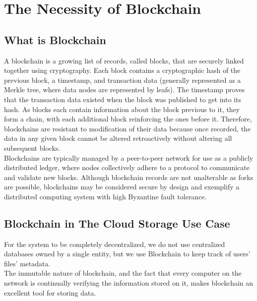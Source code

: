 
\section{The Necessity of Blockchain}

\subsection{What is Blockchain}

A blockchain is a growing list of records, called blocks, that are securely linked together using cryptography. Each block contains a cryptographic hash of the previous block, a timestamp, and transaction data (generally represented as a Merkle tree, where data nodes are represented by leafs). The timestamp proves that the transaction data existed when the block was published to get into its hash. As blocks each contain information about the block previous to it, they form a chain, with each additional block reinforcing the ones before it. Therefore, blockchains are resistant to modification of their data because once recorded, the data in any given block cannot be altered retroactively without altering all subsequent blocks. \\[-8pt]

Blockchains are typically managed by a peer-to-peer network for use as a publicly distributed ledger, where nodes collectively adhere to a protocol to communicate and validate new blocks. Although blockchain records are not unalterable as forks are possible, blockchains may be considered secure by design and exemplify a distributed computing system with high Byzantine fault tolerance.



\subsection{Blockchain in The Cloud Storage Use Case}

For the system to be completely decentralized, we do not use centralized databases owned by a single entity, but we use Blockchain to keep track of users' files' metadata. \\[-8pt]

The immutable nature of blockchain, and the fact that every computer on the network is continually verifying the information stored on it, makes blockchain an excellent tool for storing data. \\[-8pt]

